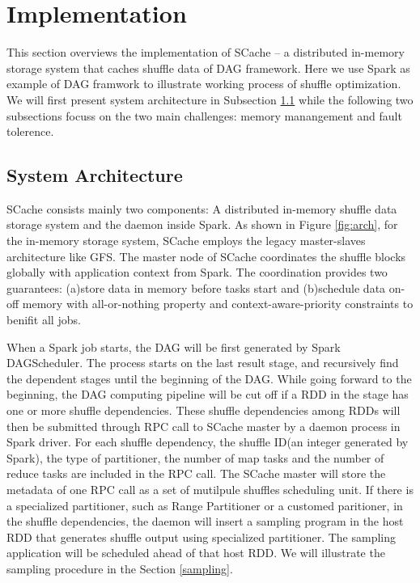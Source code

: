 \section{Implementation}\label{impl}
This section overviews the implementation of SCache -- a distributed in-memory storage system that caches shuffle data of DAG framework. Here we use Spark as example of DAG framwork to illustrate working process of shuffle optimization. We will first present system architecture in Subsection \ref{arch} while the following two subsections focuss on the two main challenges: memory manangement and fault tolerence.

\subsection{System Architecture}\label{arch}
SCache consists mainly two components: A distributed in-memory shuffle data storage system and the daemon inside Spark. As shown in Figure \ref{fig:arch}, for the in-memory storage system, SCache employs the legacy master-slaves architecture like GFS\cite{gfs}. The master node of SCache coordinates the shuffle blocks globally with application context from Spark. The coordination provides two guarantees: (a)store data in memory before tasks start and (b)schedule data on-off memory with all-or-nothing property and context-aware-priority constraints to benifit all jobs. 

When a Spark job starts, the DAG will be first generated by Spark DAGScheduler\cite{sparksource}. The process starts on the last result stage, and recursively find the dependent stages until the beginning of the DAG. While going forward to the beginning, the DAG computing pipeline will be cut off if a RDD in the stage has one or more shuffle dependencies. These shuffle dependencies among RDDs will then be submitted through RPC call to SCache master by a daemon process in Spark driver. For each shuffle dependency, the shuffle ID(an integer generated by Spark), the type of partitioner, the number of map tasks and the number of reduce tasks are included in the RPC call. The SCache master will store the metadata of one RPC call as a set of mutilpule shuffles scheduling unit. If there is a specialized partitioner, such as Range Partitioner or a customed paritioner, in the shuffle dependencies, the daemon will insert a sampling program in the host RDD that generates shuffle output using specialized partitioner. The sampling application will be scheduled ahead of that host RDD. We will illustrate the sampling procedure in the Section \ref{sampling}.

